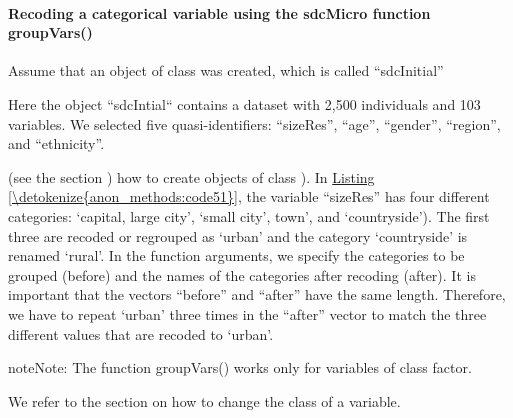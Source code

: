 \documentclass[letterpaper,10pt,english]{sphinxmanual}
\begin{document}
\paragraph{Recoding a categorical variable using the sdcMicro function groupVars()}
\label{\detokenize{anon_methods:recoding-a-categorical-variable-using-the-sdcmicro-function-groupvars}}
Assume that an object of class  was created, which is called
“sdcInitial” %
\begin{footnote}[2]\sphinxAtStartFootnote
Here the  object “sdcIntial“ contains a dataset with 2,500
individuals and 103 variables. We selected five quasi-identifiers:
“sizeRes”, “age”, “gender”, “region”, and “ethnicity”.
%
\end{footnote} (see the section
)
how to create objects of class ). In \hyperref[\detokenize{anon_methods:code51}]{Listing \ref{\detokenize{anon_methods:code51}}}, the variable “sizeRes” has
four different categories: ‘capital, large city’, ‘small city’, town’,
and ‘countryside’). The first three are recoded or regrouped as ‘urban’
and the category ‘countryside’ is renamed ‘rural’. In the function
arguments, we specify the categories to be grouped (before) and the
names of the categories after recoding (after). It is important that the
vectors “before” and “after” have the same length. Therefore, we have to
repeat ‘urban’ three times in the “after” vector to match the three
different values that are recoded to ‘urban’.

\begin{sphinxadmonition}{note}{Note:}
The function groupVars() works only for variables of class factor.
\end{sphinxadmonition}

We refer to the section 
on how to change the class of a variable.
\end{document}

